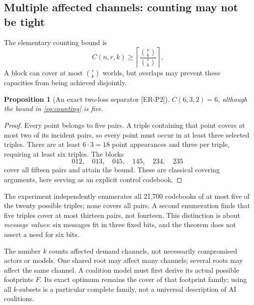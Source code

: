 \documentclass[11pt,a4paper]{article}
\newtheorem{proposition}[theorem]{Proposition}
\theoremstyle{definition}\newtheorem{definition}{Definition}
\newcommand{\idtag}[1]{\textnormal{\textsf{[#1]}}}
\begin{document}
\subsection{Multiple affected channels: counting may not be tight}
The elementary counting bound is
\begin{equation}
C(n,r,k)\geq\left\lceil\frac{\binom nk}{\binom rk}\right\rceil.
\label{eq:counting}
\end{equation}
A block can cover at most $\binom rk$ worlds, but overlaps may prevent these capacities from being achieved disjointly.

\begin{proposition}[An exact two-loss separator \idtag{ER-P2}]
\label{prop:six}
$C(6,3,2)=6$, although the bound in \cref{eq:counting} is five.
\end{proposition}
\begin{proof}
Every point belongs to five pairs. A triple containing that point covers at most two of its incident pairs, so every point must occur in at least three selected triples. There are at least $6\cdot3=18$ point appearances and three per triple, requiring at least six triples. The blocks
\[
012,\quad013,\quad045,\quad145,\quad234,\quad235
\]
cover all fifteen pairs and attain the bound. These are classical covering arguments, here serving as an explicit control codebook.
\end{proof}
The experiment independently enumerates all 21,700 codebooks of at most five of the twenty possible triples; none covers all pairs. A second enumeration finds that five triples cover at most thirteen pairs, not fourteen. This distinction is about \emph{message values}: six messages fit in three fixed bits, and the theorem does not assert a need for six bits.

The number $k$ counts affected demand channels, not necessarily compromised actors or models. One shared root may affect many channels; several roots may affect the same channel. A coalition model must first derive its actual possible footprints $F$. Its exact optimum remains the cover of that footprint family; using all $k$-subsets is a particular complete family, not a universal description of AI coalitions.
\end{document}
